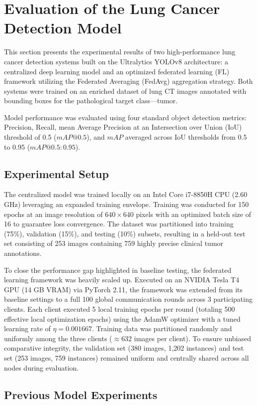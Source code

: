 \section{Evaluation of the Lung Cancer Detection Model}
This section presents the experimental results of two high-performance lung cancer detection systems built on the Ultralytics YOLOv8 architecture: a centralized deep learning model and an optimized federated learning (FL) framework utilizing the Federated Averaging (FedAvg) aggregation strategy. Both systems were trained on an enriched dataset of lung CT images annotated with bounding boxes for the pathological target class—tumor.

Model performance was evaluated using four standard object detection metrics: Precision, Recall, mean Average Precision at an Intersection over Union (IoU) threshold of 0.5 ($mAP@0.5$), and $mAP$ averaged across IoU thresholds from 0.5 to 0.95 ($mAP@0.5:0.95$).

\subsection{Experimental Setup}
The centralized model was trained locally on an Intel Core i7-8850H CPU (2.60 GHz) leveraging an expanded training envelope. Training was conducted for 150 epochs at an image resolution of $640 \times 640$ pixels with an optimized batch size of 16 to guarantee loss convergence. The dataset was partitioned into training (75\%), validation (15\%), and testing (10\%) subsets, resulting in a held-out test set consisting of 253 images containing 759 highly precise clinical tumor annotations.

To close the performance gap highlighted in baseline testing, the federated learning framework was heavily scaled up. Executed on an NVIDIA Tesla T4 GPU (14 GB VRAM) via PyTorch 2.11, the framework was extended from its baseline settings to a full 100 global communication rounds across 3 participating clients. Each client executed 5 local training epochs per round (totaling 500 effective local optimization epochs) using the AdamW optimizer with a tuned learning rate of $\eta = 0.001667$. Training data was partitioned randomly and uniformly among the three clients ($\approx 632$ images per client). To ensure unbiased comparative integrity, the validation set (380 images, 1,202 instances) and test set (253 images, 759 instances) remained uniform and centrally shared across all nodes during evaluation.

\subsection{Previous Model Experiments}

